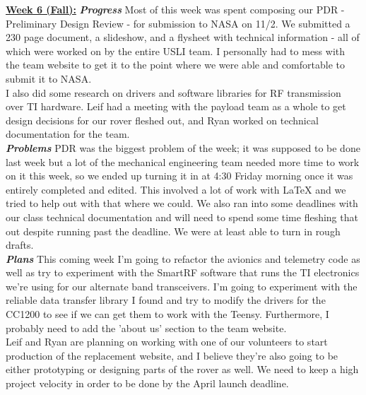 \documentclass[onecolumn, draftclsnofoot, 10pt, compsoc]{IEEEtran}
\begin{document}
\underline{\textbf{Week 6 (Fall):}}
\newline\textbf{\textit{{Progress}}}
\newline Most of this week was spent composing our PDR - Preliminary Design Review - for submission to NASA on
11/2. We submitted a 230 page document, a slideshow, and a flysheet with technical information - all of
which were worked on by the entire USLI team. I personally had to mess with the team website to get it
to the point where we were able and comfortable to submit it to NASA. \\

I also did some research on drivers and software libraries for RF transmission over TI hardware. Leif had
a meeting with the payload team as a whole to get design decisions for our rover fleshed out, and Ryan
worked on technical documentation for the team. \\

\textbf{\textit{{Problems}}}
\newline PDR was the biggest problem of the week; it was supposed to be done last week but a lot of the mechanical
engineering team needed more time to work on it this week, so we ended up turning it in at 4:30 Friday
morning once it was entirely completed and edited. This involved a lot of work with LaTeX and we tried to
help out with that where we could. We also ran into some deadlines with our class technical documentation
and will need to spend some time fleshing that out despite running past the deadline. We were at least 
able to turn in rough drafts. \\

\textbf{\textit{{Plans}}}
\newline This coming week I'm going to refactor the avionics and telemetry code as well as try to experiment with
the SmartRF software that runs the TI electronics we're using for our alternate band transceivers. I'm
going to experiment with the reliable data transfer library I found and try to modify the drivers for the
CC1200 to see if we can get them to work with the Teensy. Furthermore, I probably need to add the 'about
us' section to the team website. \\

Leif and Ryan are planning on working with one of our volunteers to start production of the replacement
website, and I believe they're also going to be either prototyping or designing parts of the rover as 
well. We need to keep a high project velocity in order to be done by the April launch deadline. \\
\end{document}
